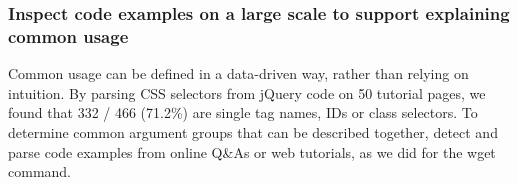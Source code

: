 \begin{changes}
\subsubsection{Inspect code examples on a large scale to support explaining common usage}
Common usage can be defined in a data-driven way, rather than relying on intuition.
By parsing CSS selectors from jQuery code on 50 tutorial pages, we found that 332 / 466 (71.2\%) are single tag names, IDs or class selectors.
To determine common argument groups that can be described together, detect and parse code examples from online Q\&As or web tutorials, as we did for the wget command.

\end{changes}
